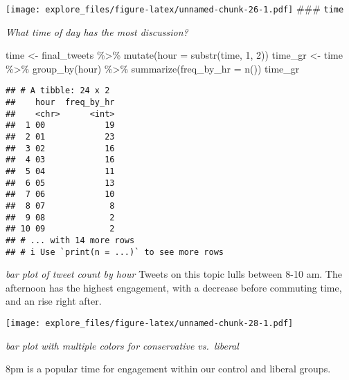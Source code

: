 \documentclass[
]{article}
\newenvironment{Shaded}{\begin{snugshade}}{\end{snugshade}}
\newcommand{\AttributeTok}[1]{\textcolor[rgb]{0.77,0.63,0.00}{#1}}
\newcommand{\DecValTok}[1]{\textcolor[rgb]{0.00,0.00,0.81}{#1}}
\newcommand{\FunctionTok}[1]{\textcolor[rgb]{0.00,0.00,0.00}{#1}}
\newcommand{\NormalTok}[1]{#1}
\newcommand{\OtherTok}[1]{\textcolor[rgb]{0.56,0.35,0.01}{#1}}
\newcommand{\SpecialCharTok}[1]{\textcolor[rgb]{0.00,0.00,0.00}{#1}}
\begin{document}
\texttt{[image: explore\_files/figure-latex/unnamed-chunk-26-1.pdf]}
\#\#\# \texttt{time}

\emph{What time of day has the most discussion?}

\begin{Shaded}
\begin{Highlighting}[]
\NormalTok{time }\OtherTok{\textless{}{-}}\NormalTok{ final\_tweets }\SpecialCharTok{\%\textgreater{}\%} \FunctionTok{mutate}\NormalTok{(}\AttributeTok{hour =} \FunctionTok{substr}\NormalTok{(time, }\DecValTok{1}\NormalTok{, }\DecValTok{2}\NormalTok{))}
\NormalTok{time\_gr }\OtherTok{\textless{}{-}}\NormalTok{ time }\SpecialCharTok{\%\textgreater{}\%} \FunctionTok{group\_by}\NormalTok{(hour) }\SpecialCharTok{\%\textgreater{}\%} \FunctionTok{summarize}\NormalTok{(}\AttributeTok{freq\_by\_hr =} \FunctionTok{n}\NormalTok{())}
\NormalTok{time\_gr}
\end{Highlighting}
\end{Shaded}

\begin{verbatim}
## # A tibble: 24 x 2
##    hour  freq_by_hr
##    <chr>      <int>
##  1 00            19
##  2 01            23
##  3 02            16
##  4 03            16
##  5 04            11
##  6 05            13
##  7 06            10
##  8 07             8
##  9 08             2
## 10 09             2
## # ... with 14 more rows
## # i Use `print(n = ...)` to see more rows
\end{verbatim}

\emph{bar plot of tweet count by hour} Tweets on this topic lulls
between 8-10 am. The afternoon has the highest engagement, with a
decrease before commuting time, and an rise right after.

\begin{Shaded}
\end{Shaded}

\texttt{[image: explore\_files/figure-latex/unnamed-chunk-28-1.pdf]}

\emph{bar plot with multiple colors for conservative vs.~liberal}

8pm is a popular time for engagement within our control and liberal
groups.
\end{document}
